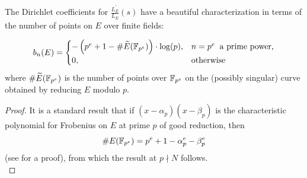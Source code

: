 \documentclass[10pt]{article}
\newcommand{\pr}{^{\prime}}
\newcommand{\ldLes}{\frac{L_E\pr}{L_E}(s)}
\begin{document}
The Dirichlet coefficients for $\ldLes$ have a beautiful characterization in terms of the number of points on $E$ over finite fields:
\begin{theorem}[S.]
\begin{equation}
b_n(E) = \begin{cases}
-\left(p^e + 1 - \#\widetilde{E}(\mathbb{F}_{p^e})\right)\cdot \log(p), & n=p^e\;\;\text{a prime power,} \\
0, & \text{otherwise} \end{cases}
\end{equation}
where $\#\widetilde{E}(\mathbb{F}_{p^e})$ is the number of points over $\mathbb{F}_{p^e}$ on the (possibly singular) curve obtained by reducing $E$ modulo $p$.
\end{theorem}

\begin{proof}
It is a standard result that if $(x-\alpha_p)(x-\beta_p)$ is the characteristic polynomial for Frobenius on $E$ at prime $p$ of good reduction, then
\begin{equation}
\#E(\mathbb{F}_{p^e}) = p^e + 1 - \alpha_p^e - \beta_p^e
\end{equation}
(see \cite[pp. 134-136]{Sil-1985} for a proof), from which the result at $p \nmid N$ follows. \\


\end{proof}
\end{document}
